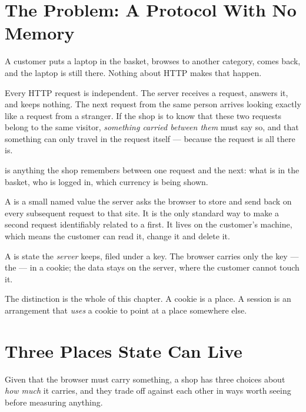 \section{The Problem: A Protocol With No Memory}

A customer puts a laptop in the basket, browses to another category, comes back,
and the laptop is still there. Nothing about HTTP makes that happen.

Every HTTP request is independent. The server receives a request, answers it,
and keeps nothing. The next request from the same person arrives looking exactly
like a request from a stranger. If the shop is to know that these two requests
belong to the same visitor, \emph{something carried between them} must say so,
and that something can only travel in the request itself --- because the request
is all there is.

\begin{definitionbox}
 is anything the shop remembers between one request and the next:
what is in the basket, who is logged in, which currency is being shown.

\smallskip
A  is a small named value the server asks the browser to store and
send back on every subsequent request to that site. It is the only standard way
to make a second request identifiably related to a first. It lives on the
customer's machine, which means the customer can read it, change it and delete
it.

\smallskip
A  is state the \emph{server} keeps, filed under a key. The
browser carries only the key --- the  --- in a cookie;
the data stays on the server, where the customer cannot touch it.

\smallskip
The distinction is the whole of this chapter. A cookie is a place. A session is
an arrangement that \emph{uses} a cookie to point at a place somewhere else.
\end{definitionbox}

\section{Three Places State Can Live}

Given that the browser must carry something, a shop has three choices about
\emph{how much} it carries, and they trade off against each other in ways worth
seeing before measuring anything.

